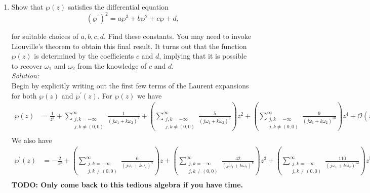 \documentclass[10pt]{amsart}
\theoremstyle{nonumberplain}
\begin{document}
\begin{enumerate}[label={\bf {\arabic*}:}]
\begin{enumerate}
\item Show that $\wp(z)$ satisfies the differential equation
$$ \left(\wp^{\prime}\right)^2=a \wp^3+b \wp^2+c \wp+d, $$

for suitable choices of $a, b, c, d$. Find these constants. You may need to invoke Liouville's theorem to obtain this final result. It turns out that the function $\wp(z)$ is determined by the coefficients $c$ and $d$, implying that it is possible to recover $\omega_1$ and $\omega_2$ from the knowledge of $c$ and $d$. \\

\noindent
\textit{Solution:} \\
Begin by explicitly writing out the first few terms of the Laurent expansions for both $\wp(z)$ and $\wp^\prime(z)$.
For $\wp(z)$ we have
\begin{align*}
\wp(z) &= \frac{1}{z^2}
	+ \sum_{\substack{j, k=-\infty \\ j,k \neq (0,0)}}^{\infty} \frac 1 {\left( j \omega_1 + k \omega_2\right)^2}
	+ \left( \sum_{\substack{j, k=-\infty \\ j,k \neq (0,0)}}^{\infty} \frac 5 {\left( j \omega_1 + k \omega_2\right)^6} \right) z^2
	+ \left( \sum_{\substack{j, k=-\infty \\ j,k \neq (0,0)}}^{\infty} \frac 9 {\left( j \omega_1 + k \omega_2\right)^{10}} \right) z^4
	+ \mathcal O (z^6) \\
\end{align*}
We also have
\begin{align*}
\wp^\prime(z) &= -\frac{2}{z^3}
	+ \left( \sum_{\substack{j, k=-\infty \\ j,k \neq (0,0)}}^{\infty} \frac 6 {\left( j \omega_1 + k \omega_2\right)^4} \right) z
	+ \left( \sum_{\substack{j, k=-\infty \\ j,k \neq (0,0)}}^{\infty} \frac {42} {\left( j \omega_1 + k \omega_2\right)^8} \right) z^3
	+ \left( \sum_{\substack{j, k=-\infty \\ j,k \neq (0,0)}}^{\infty} \frac {110} {\left( j \omega_1 + k \omega_2\right)^{12}} \right) z^5 
	+ \mathcal O (z^7) \\
\end{align*}
\textbf{TODO: Only come back to this tedious algebra if you have time.}
\\

\end{enumerate}
\end{enumerate}
\end{document}
